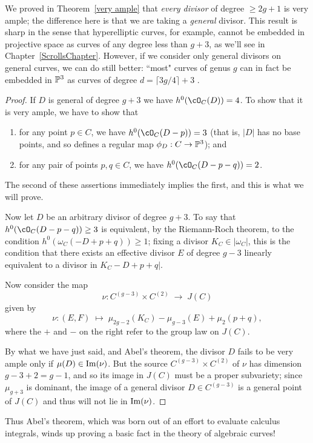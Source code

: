 We proved in Theorem~\ref{very ample} that \emph{every divisor} of degree $\geq 2g+1$ is very ample; the difference here is that we are taking a \emph{general} divisor. This result is sharp in the sense that hyperelliptic curves, for example, cannot be embedded in projective space as curves of any degree less than $g+3$, as we'll see in Chapter~\ref{ScrollsChapter}. However, if we consider only general divisors on general curves, we can do still better: ``most" curves of genus $g$ can in fact be embedded in $\PP^{3}$ as curves of degree $d = \lceil 3g/4 \rceil + 3$ \cite{}.

\begin{proof}
If $D$ is general of degree $g+3$ we have $h^0(\cO_C(D)) = 4$. To show that it is very ample, we have to show that
\begin{enumerate}
\item for any point $p \in C$, we have $h^0(\cO_C(D-p)) = 3$ (that is, $|D|$ has no base points, and so defines a regular map $\phi_D : C \to \PP^3$); and
\item for any pair of points $p, q \in C$, we have $h^0(\cO_C(D-p-q)) = 2$.
\end{enumerate}
The second of these assertions immediately implies the first, and this is what we will prove.

Now let $D$ be an arbitrary divisor of degree $g+3$. To say that $h^0(\cO_C(D-p-q)) \geq 3$ is equivalent, by the Riemann-Roch theorem, to the condition $h^0(\omega_C(-D + p + q)) \geq 1$; fixing a divisor 
$K_{C}\in |\omega_{C}|$, this is the condition that there exists  
an effective divisor $E$ of degree $g-3$ linearly equivalent to a divisor in $K_C - D + p + q|$. 

Now consider the map 
$$
\nu : C^{(g-3)} \times C^{(2)} \; \to \; J(C)
$$
given by
$$
\nu : (E,F) \; \mapsto \; \mu_{2g-2}(K_C) - \mu_{g-3}(E) + \mu_{2}(p+q), 
$$
where the $+$ and $-$ on the right refer to the group law on $J(C)$. 

By what we have just said, and Abel's theorem, the divisor $D$ fails to be very ample only if
$\mu(D) \in {\rm Im}(\nu)$. But the source $C^{(g-3)} \times C^{(2)}$ of $\nu$ has dimension $g-3+2 = g-1$, and so its image in $J(C)$ must be a proper subvariety; since $\mu_{g+3}$ is dominant, the image of a general divisor $D \in C^{(g-3)}$ is a general point of $J(C)$ and thus will not lie in ${\rm Im}(\nu)$. 
\end{proof}

Thus Abel's theorem, which was born out of an effort to evaluate calculus integrals, winds up proving a basic fact in the theory of algebraic curves!

